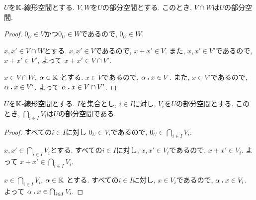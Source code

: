 \begin{example}
  $U$を$\mathbb{K}$-線形空間とする.
  $V, W$を$U$の部分空間とする.
  このとき, $V\cap W$は$U$の部分空間.
\end{example}
\begin{proof}
$0_U\in V$かつ$0_U\in W$であるので, $0_U\in W$.

$x,x' \in V\cap W$とする.
$x,x'\in V$であるので,
$x\plus x' \in V$.
また,
$x,x'\in V'$であるので,
$x\plus x' \in V'$,
よって
$x\plus x' \in V\cap V'$.


$x \in V\cap W$,
$\alpha \in \mathbb{K}$
とする.
$x\in V$であるので,
$\alpha\mathbin{\boldsymbol{.}} x \in V$.
また,
$x\in V'$であるので,
$\alpha\mathbin{\boldsymbol{.}} x \in V'$.
よって
$\alpha\mathbin{\boldsymbol{.}} x \in V\cap V'$.
\end{proof}


\begin{example}
  $U$を$\mathbb{K}$-線形空間とする.
  $I$を集合とし,
  $i\in I$に対し, $V_i$を$U$の部分空間とする.
  このとき, $\bigcap_{i\in I}V_i$は$U$の部分空間である.
\end{example}
\begin{proof}
すべての$i\in I$に対し
$0_U\in V_i$であるので,
$0_U\in \bigcap_{i\in I}V_i$.

$x,x' \in \bigcap_{i\in I}V_i$とする.
すべての$i\in I$に対し,
$x,x'\in V_i$であるので,
$x\plus x' \in V_i$.
よって
$x\plus x' \in \bigcap_{i\in I}V_i$.


$x \in \bigcap_{i\in I}V_i$,
$\alpha \in \mathbb{K}$
とする.
すべての$i\in I$に対し,
$x\in V_i$であるので,
$\alpha\mathbin{\boldsymbol{.}} x \in V_i$.
よって
$\alpha\mathbin{\boldsymbol{.}} x \in \bigcap_{i\in I}V_i$.
\end{proof}



